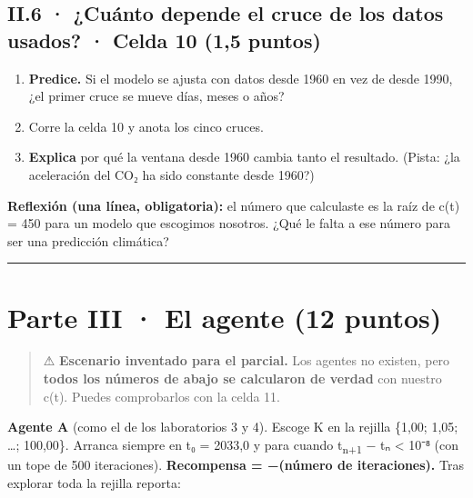 \subsection{II.6 · ¿Cuánto depende el cruce de los datos usados? · Celda 10 (1,5 puntos)}

\begin{enumerate}
\def\labelenumi{(\alph{enumi})}
\item
  \textbf{Predice.} Si el modelo se ajusta con datos desde 1960 en vez de desde 1990, ¿el primer cruce se mueve días, meses o años?
\item
  Corre la celda 10 y anota los cinco cruces.
\item
  \textbf{Explica} por qué la ventana desde 1960 cambia tanto el resultado. (Pista: ¿la aceleración del CO₂ ha sido constante desde 1960?)
\end{enumerate}

\textbf{Reflexión (una línea, obligatoria):} el número que calculaste es la raíz de c(t) = 450 para un modelo que escogimos nosotros. ¿Qué le falta a ese número para ser una predicción climática?

\begin{center}\rule{0.5\linewidth}{0.5pt}\end{center}

\section{Parte III · El agente (12 puntos)}

\begin{quote}
⚠ \textbf{Escenario inventado para el parcial.} Los agentes no existen, pero \textbf{todos los números de abajo se calcularon de verdad} con nuestro c(t). Puedes comprobarlos con la celda 11.
\end{quote}

\textbf{Agente A} (como el de los laboratorios 3 y 4). Escoge K en la rejilla \{1,00; 1,05; \ldots; 100,00\}. Arranca siempre en t₀ = 2033,0 y para cuando \textbar t\textsubscript{n+1} − tₙ\textbar{} \textless{} 10⁻⁸ (con un tope de 500 iteraciones). \textbf{Recompensa = −(número de iteraciones).} Tras explorar toda la rejilla reporta:

